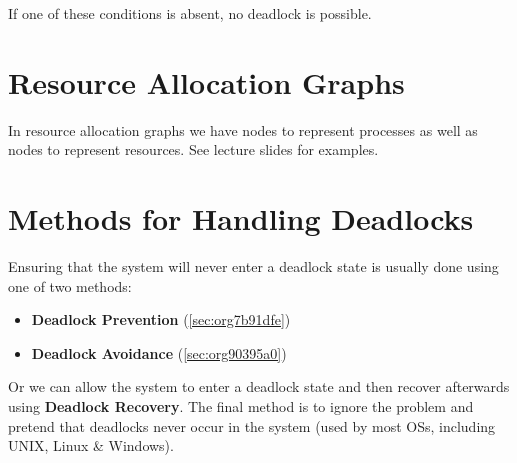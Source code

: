 \documentclass[11pt]{article}
\begin{document}
If one of these conditions is absent, no deadlock is possible.

\section{Resource Allocation Graphs}
\label{sec:orge126f67}
In resource allocation graphs we have nodes to represent processes as well as nodes to represent resources.
See lecture slides for examples.

\section{Methods for Handling Deadlocks}
\label{sec:orgeb5a494}
Ensuring that the system will never enter a deadlock state is usually done using one of two methods:
\begin{itemize}
\item \textbf{Deadlock Prevention} (\ref{sec:org7b91dfe})
\item \textbf{Deadlock Avoidance} (\ref{sec:org90395a0})
\end{itemize}
Or we can allow the system to enter a deadlock state and then recover afterwards using \textbf{Deadlock Recovery}.
The final method is to ignore the problem and pretend that deadlocks never occur in the system (used by most OSs, including UNIX, Linux \& Windows).
\end{document}
